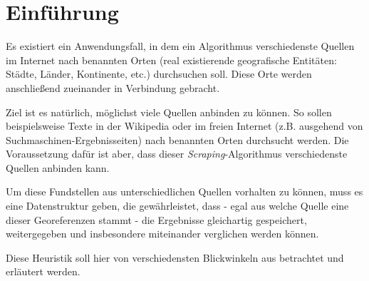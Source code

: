 \section{Einführung}
\label{introduction}
Es existiert ein Anwendungsfall, in dem ein Algorithmus verschiedenste Quellen im Internet nach benannten Orten (real existierende geografische Entitäten: Städte, Länder, Kontinente, etc.) durchsuchen soll. Diese Orte werden anschließend zueinander in Verbindung gebracht.

Ziel ist es natürlich, möglichst viele Quellen anbinden zu können. So sollen beispielsweise Texte in der Wikipedia oder im freien Internet (z.B. ausgehend von Suchmaschinen-Ergebnisseiten) nach benannten Orten durchsucht werden. Die Voraussetzung dafür ist aber, dass dieser \textit{Scraping}-Algorithmus verschiedenste Quellen anbinden kann.

Um diese Fundstellen aus unterschiedlichen Quellen vorhalten zu können, muss es eine Datenstruktur geben, die gewährleistet, dass - egal aus welche Quelle eine dieser Georeferenzen stammt - die Ergebnisse gleichartig gespeichert, weitergegeben und insbesondere miteinander verglichen werden können.

Diese Heuristik soll hier von verschiedensten Blickwinkeln aus betrachtet und erläutert werden.
